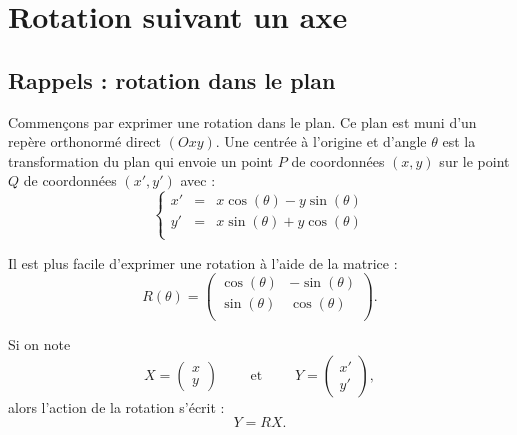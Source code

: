 \documentclass[11pt,class=report,crop=false]{standalone}
\begin{document}

%
%
%




\section{Rotation suivant un axe}

\subsection{Rappels : rotation dans le plan}

Commençons par exprimer une rotation dans le plan. Ce plan est muni d'un repère orthonormé direct $(Oxy)$.
Une  centrée à l'origine et d'angle $\theta$ est la transformation du plan qui envoie un point $P$ de coordonnées $(x,y)$ sur le point $Q$ de coordonnées $(x',y')$ avec :
$$
\left\{
\begin{array}{rcl}
x' &=& x \cos(\theta) - y \sin(\theta) \\
y' &=& x \sin(\theta) + y \cos(\theta) \\
\end{array}
\right.$$



Il est plus facile d'exprimer une rotation à l'aide de la matrice :
$$R(\theta) = 
\begin{pmatrix}
\cos(\theta) & - \sin(\theta) \\
\sin(\theta) & \cos(\theta) \\
\end{pmatrix}.
$$

Si on note 
$$X = \begin{pmatrix} x \\ y \end{pmatrix} \qquad \text{ et } \qquad Y = \begin{pmatrix} x' \\ y' \end{pmatrix},$$
alors l'action de la rotation s'écrit :
$$Y = R X.$$
\end{document}
